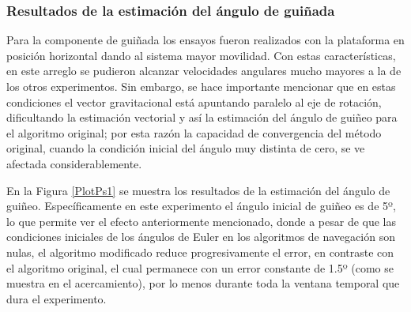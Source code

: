 \documentclass[10pt]{report}
\numberwithin{equation}{chapter}
\numberwithin{algorithm}{chapter}
\begin{document}
\subsubsection{Resultados de la estimación del ángulo de guiñada}
Para la componente de guiñada los ensayos fueron realizados con la plataforma en posición horizontal dando al sistema mayor movilidad. Con estas características, en este arreglo se pudieron alcanzar velocidades angulares mucho mayores a la de los otros experimentos. Sin embargo, se hace importante mencionar que en estas condiciones el vector gravitacional está apuntando paralelo al eje de rotación, dificultando la estimación vectorial y así la estimación del ángulo de guiñeo para el algoritmo original; por esta razón la capacidad de convergencia del método original, cuando la condición inicial del ángulo muy distinta de cero, se ve afectada considerablemente.\par
En la Figura \ref{PlotPs1} se muestra los resultados de la estimación del ángulo de guiñeo. Específicamente en este experimento el ángulo inicial de guiñeo es de 5º, lo que permite ver el efecto anteriormente mencionado, donde a pesar de que las condiciones iniciales de los ángulos de Euler en los algoritmos de navegación son nulas, el algoritmo modificado reduce progresivamente el error, en contraste con el algoritmo original, el cual permanece con un error constante de 1.5º (como se muestra en el acercamiento), por lo menos durante toda la ventana temporal que dura el experimento.\par
\end{document}
